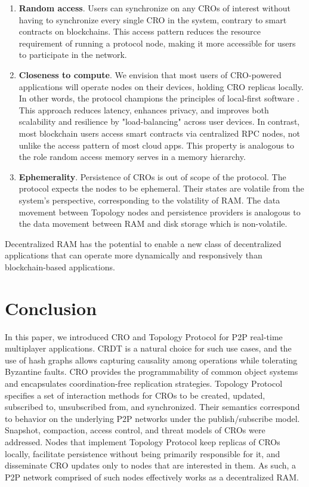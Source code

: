 \documentclass{article}
\begin{document}
\begin{enumerate}
    \item \textbf{Random access}. Users can synchronize on any CROs of interest without having to synchronize every single CRO in the system, contrary to smart contracts on blockchains. This access pattern reduces the resource requirement of running a protocol node, making it more accessible for users to participate in the network.
    \item \textbf{Closeness to compute}. We envision that most users of CRO-powered applications will operate nodes on their devices, holding CRO replicas locally. In other words, the protocol champions the principles of local-first software \cite{LoFi}. This approach reduces latency, enhances privacy, and improves both scalability and resilience by "load-balancing" across user devices. In contrast, most blockchain users access smart contracts via centralized RPC nodes, not unlike the access pattern of most cloud apps. This property is analogous to the role random access memory serves in a memory hierarchy.
    \item \textbf{Ephemerality}. Persistence of CROs is out of scope of the protocol. The protocol expects the nodes to be ephemeral. Their states are volatile from the system's perspective, corresponding to the volatility of RAM. The data movement between Topology nodes and persistence providers is analogous to the data movement between RAM and disk storage which is non-volatile.
\end{enumerate}
\noindent

Decentralized RAM has the potential to enable a new class of decentralized applications that can operate more dynamically and responsively than blockchain-based applications.

\section{Conclusion}

In this paper, we introduced CRO and Topology Protocol for P2P real-time multiplayer applications. CRDT is a natural choice for such use cases, and the use of hash graphs allows capturing causality among operations while tolerating Byzantine faults. CRO provides the programmability of common object systems and encapsulates coordination-free replication strategies. Topology Protocol specifies a set of interaction methods for CROs to be created, updated, subscribed to, unsubscribed from, and synchronized. Their semantics correspond to behavior on the underlying P2P networks under the publish/subscribe model. Snapshot, compaction, access control, and threat models of CROs were addressed. Nodes that implement Topology Protocol keep replicas of CROs locally, facilitate persistence without being primarily responsible for it, and disseminate CRO updates only to nodes that are interested in them. As such, a P2P network comprised of such nodes effectively works as a decentralized RAM.
\end{document}
